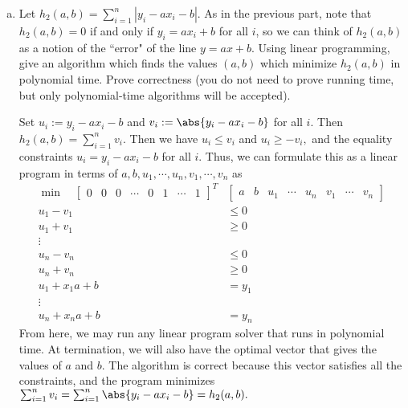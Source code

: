 \documentclass{article}
\begin{document}
\begin{enumerate}[(a)]
	\item Let $h_2(a,b) = \sum_{i=1}^n |y_i - ax_i - b|$.  As in the previous part, note that $h_2(a,b) = 0$ if and only if $y_i = ax_i + b$ for all $i$, so we can think of $h_2(a,b)$ as a notion of the ``error" of the line $y = ax + b$.  Using linear programming, give an algorithm which finds the values $(a,b)$ which minimize $h_2(a,b)$ in polynomial time.  Prove correctness (you do not need to prove running time, but only polynomial-time algorithms will be accepted).
		\begin{soln}
			Set $u_i:=y_i-ax_i-b$ and $v_i:=\abs{y_i-ax_i-b}$ for all $i.$ Then $h_2(a, b) = \sum_{i=1}^{n}v_i.$ Then we have $u_i\le v_i$ and $u_i\ge -v_i,$ and the equality constraints $u_i=y_i-ax_i-b$ for all $i.$ Thus, we can formulate this as a linear program in terms of $a, b, u_1, \cdots, u_n, v_1, \cdots, v_n$ as
			\begin{align*}
				\min\quad \begin{bmatrix}
					0 & 0 & 0 & \cdots & 0 & 1 & \cdots & 1
				\end{bmatrix}^T &\begin{bmatrix}
					a & b & u_1 & \cdots & u_n & v_1 & \cdots & v_n
				\end{bmatrix} \\
				u_1 - v_1 &\le 0 \\
				u_1 + v_1 &\ge 0 \\
				\vdots \\
				u_n - v_n &\le 0 \\
				u_n + v_n &\ge 0 \\
				u_1 + x_1a + b & = y_1 \\
				\vdots \\
				u_n + x_n a + b &= y_n
			\end{align*}
			From here, we may run any linear program solver that runs in polynomial time. At termination, we will also have the optimal vector that gives the values of $a$ and $b.$ The algorithm is correct because this vector satisfies all the constraints, and the program minimizes $\sum_{i=1}^{n} v_i = \sum_{i=1}^{n} \abs{y_i-ax_i-b} = h_2(a, b).$
		\end{soln}
\end{enumerate}
\end{document}
